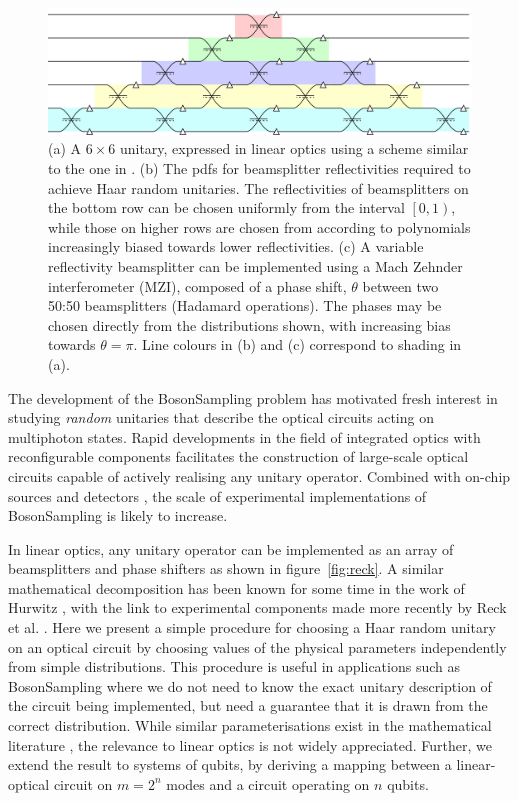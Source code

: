 \documentclass[aps,prl,twocolumn,floatfix]{revtex4}
\newcommand{\by}{\times}
\newcommand{\pdf}{{pdf}}
\newcommand{\bosonsampling}{\textsc BosonSampling}
\begin{document}
\begin{figure}[t]
  \includegraphics{figures/example}
  \caption{(a) A \(6 \by 6\) unitary, expressed in linear optics using a scheme
    similar to the one in \cite{re-prl-73-58}. (b) The \pdf{}s for
    beamsplitter reflectivities required to achieve Haar random unitaries.
    The reflectivities of beamsplitters on the
    bottom row can be chosen uniformly from the interval \(\left[ 0,1 \right)\),
    while those on higher rows are chosen from according to polynomials
    increasingly biased towards lower reflectivities. (c) A variable
    reflectivity beamsplitter can be implemented using a Mach Zehnder
    interferometer (MZI), composed of a phase shift, \(\theta\) between two
    50:50 beamsplitters (Hadamard operations). The phases may be chosen directly
    from the distributions shown, with increasing bias towards \(\theta=\pi\).
    Line colours in (b) and (c) correspond to shading in (a).}
  \label{fig:example}
\end{figure}

The development of the \bosonsampling{} problem \cite{aa-conf-11-333} has
motivated fresh interest in studying \emph{random} unitaries that describe the
optical circuits acting on multiphoton states. Rapid developments in the field
of integrated optics with reconfigurable components facilitates the construction
of large-scale optical circuits capable of actively realising any unitary
operator. Combined with on-chip sources \cite{si-nphoton-8-104}
and detectors \cite{re-srep-3, pe-ncomm-3-1325}, the scale of experimental
implementations of \bosonsampling{} \cite{cr-nat-7-545, br-sci-339-794,
sp-sci-339-798, ti-nphoton-7-540} is likely to increase.

In linear optics, any unitary operator can be implemented as an array of
beamsplitters and phase shifters as shown in figure~\ref{fig:reck}. A similar
mathematical decomposition has been known for some time in the work of Hurwitz
\cite{hurwitz}, with the link to experimental components made more recently by
Reck et al. \cite{re-prl-73-58}. Here we present a simple procedure for choosing
a Haar random unitary on an optical circuit by choosing values of the physical
parameters independently from simple distributions. This procedure is useful in
applications such as \bosonsampling{} where we do not need to know the exact
unitary description of the circuit being implemented, but need a guarantee that
it is drawn from the correct distribution. While similar parameterisations exist
in the mathematical literature \cite{sp-jmp-53-013501, zy-jpa-27-4235}, the
relevance to linear optics is not widely appreciated. Further, we extend the
result to systems of qubits, by deriving a mapping between a linear-optical
circuit on \(m=2^{n}\) modes and a circuit operating on \(n\) qubits.
\end{document}
